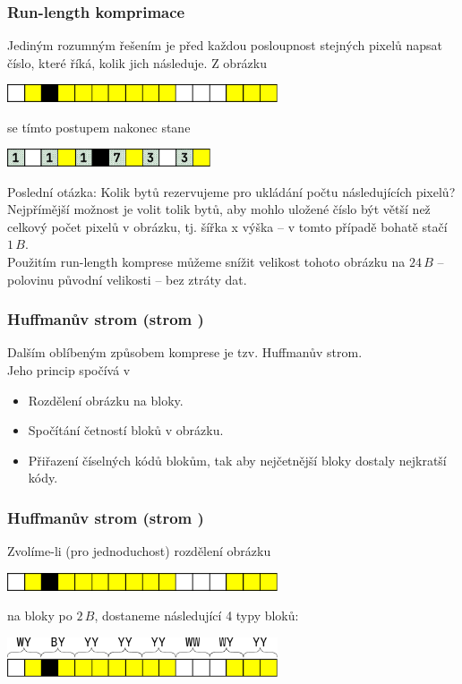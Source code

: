 \documentclass[aspectratio=169,11pt,svgnames,handout]{beamer}
\begin{document}
\begin{frame}
 \frametitle{Run-length komprimace}
 Jediným rozumným řešením je před každou posloupnost stejných pixelů napsat
 číslo, které říká, kolik jich následuje.
 \pause
 Z obrázku
 \begin{center}
  \includegraphics[width=8cm]{image-4.pdf}
  \vspace*{-.5em}
 \end{center}
 se tímto postupem nakonec stane
 \pause
 \begin{center}
  \includegraphics[width=6cm]{image-6.pdf}
  \vspace*{-.5em}
 \end{center}
 \pause
 Poslední otázka: Kolik bytů rezervujeme pro ukládání počtu následujících
 pixelů?\pause\\
 Nejpřímější možnost je volit tolik bytů, aby mohlo uložené číslo být větší než
 celkový počet pixelů v obrázku, tj. šířka x výška -- v tomto případě bohatě
 stačí $1\,B$.\pause\\
 Použitím \alert{run-length} komprese můžeme snížit velikost tohoto obrázku na
 $24\,B$ -- polovinu původní velikosti -- \alert{bez ztráty dat}.
\end{frame}

\begin{frame}
 \frametitle{Huffmanův strom (strom )}
 Dalším oblíbeným způsobem komprese je tzv. \alert{Huffmanův strom}.\pause\\
 Jeho princip spočívá v
 \begin{itemize}[label=\textbullet]
  \item Rozdělení obrázku na bloky.
  \pause
  \item Spočítání četností bloků v obrázku.
  \pause
  \item Přiřazení číselných kódů blokům, tak aby \alert{nejčetnější bloky
   dostaly nejkratší kódy}.
 \end{itemize}
\end{frame}

\begin{frame}
 \frametitle{Huffmanův strom (strom )}
 Zvolíme-li (pro jednoduchost) rozdělení obrázku
 \begin{center}
  \includegraphics[width=8cm]{image-4.pdf}
  \vspace*{-.5em}
 \end{center}
 na bloky po $2\,B$, dostaneme následující 4 typy bloků:
 \begin{center}
  \includegraphics[width=8cm]{image-7.pdf}
  \vspace*{-.5em}
 \end{center}
\end{frame}
\end{document}
